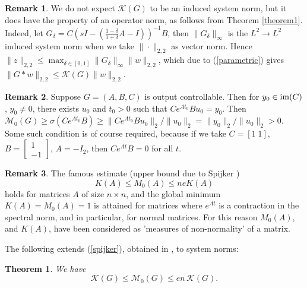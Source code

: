 \documentclass[12pt, a4paper,reqno]{amsart}
\newtheorem{theorem}{\bf Theorem}
\theoremstyle{definition}
\newtheorem{remark}{Remark}{\rm}
\begin{document}
\begin{remark}
We do not expect $\mathcal K(G)$ to be an induced system norm, but
it does have the property of an operator norm, as follows from Theorem \ref{theorem1}. Indeed,
let $G_\delta = C(sI-(\frac{1-\delta}{1+\delta}A-I))^{-1}B$, then $\|G_\delta\|_\infty$ is the $L^2\to L^2$ induced
system norm when we take $\|\cdot\|_{2,2}$ as vector norm. Hence 
$\|z\|_{2,2} \leq \max_{\delta \in [0,1]} \|G_\delta\|_\infty \|w\|_{2,2}$, which due to (\ref{parametric})
gives $\|G \ast w\|_{2,2}\leq \mathcal K(G)\|w\|_{2,2}$.
\end{remark}


\begin{remark}
Suppose $G=(A,B,C)$ is output controllable. Then for $y_0\in {\rm im}(C)$, $y_0 \not=0$,  there exists $u_0$ and $t_0 > 0$ such that $Ce^{At_0}B u_0 = y_0$. 
Then $\mathcal M_0(G) \geq \overline{\sigma}(Ce^{At_0}B) \geq \|Ce^{At_0} B u_0\|_2/\|u_0\|_2 = \|y_0\|_2/\|u_0\|_2 > 0$. Some such condition is of course required, because if we take
$C = [1 \; 1]$, $B= \begin{bmatrix} 1\\-1\end{bmatrix}$, $A= -I_2$, then $Ce^{At}B=0$ for all $t$.
\end{remark}

\begin{remark}
The famous
estimate (upper bound due to Spijker \cite{spijker})
\begin{equation}
\label{spijker}
K(A) \leq M_0(A) \leq n e K(A)
\end{equation}
holds for matrices $A$ of size $n \times n$, and the global minimum $K(A)=M_0(A)=1$ is attained  for matrices
where $e^{At}$ is a contraction in the spectral norm, and in particular,  for normal matrices. For this reason $M_0(A)$, and $K(A)$, have been considered as
'measures of non-normality' of a matrix.  
\end{remark}



The following extends (\ref{spijker}), obtained in   \cite{kreiss_himself,leveque,spijker}, to system norms:

\begin{theorem}\label{KreissUB}
We have
$$ 
\mathcal K(G) \leq \mathcal M_0(G) \leq en\, \mathcal K(G).
$$
\end{theorem}
\end{document}
